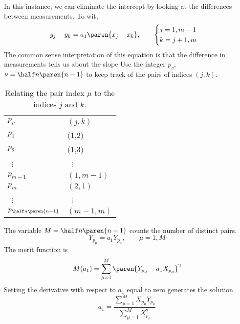 In this instance, we can eliminate the intercept by looking at the differences between measurements. To wit,
  \begin{equation*}   %
      y_{j} - y_{k} = a_{1} \paren{x_{j} - x_{k}}, \qquad \begin{cases}j=1, m-1\\ k= j+1, m\end{cases}
   \label{eq:difference jk}
  \end{equation*}
The common sense interpretation of this equation is that the difference in measurements tells us about the slope
Use the integer $p_{\nu}$, $\nu=\half n\paren{n-1}$ to keep track of the pairs of indices $(j,k)$. 
\begin{table}[htbp]
    \caption{Relating the pair index $\mu$ to the indices $j$ and $k$.}
    \begin{center}
        \begin{tabular}{ll}
					$p_{\mu}$ & $(j,k)$ \\\hline
    			$p_{1}$ & (1,2) \\
    			$p_{2}$ & (1,3) \\
    			\ $\vdots$ & \ $\vdots$ \\
    			$p_{m-1}$ & $(1,m-1)$  \\
    			$p_{m}$ & $(2,1)$  \\
    			\ $\vdots$ & \ $\vdots$ \\
    			$p_{\half n\paren{n-1}}$ & $(m-1,m)$  \\
        \end{tabular}
    \end{center}
    \label{default}
\end{table}
The variable $M  = \half n\paren{n-1}$ counts the number of distinct pairs.
  \begin{equation*}   %
      Y_{p_{\mu}} = a_{1} Y_{p_{\mu}}, \qquad \mu = 1, M
   \label{eq:difference jk}
  \end{equation*}
The merit function is
  \begin{equation*}   %
      M(a_{1}) = \sum_{\mu=1}^{M} \paren{Y_{p_{\mu}} - a_{1} X_{p_{\mu}}}^{2}
  \end{equation*}
Setting the derivative with respect to $a_{1}$ equal to zero generates the solution
  \begin{equation*}   %
      a_{1} = \frac{\sum_{\mu=1}^{M} X_{p_{\mu}} Y_{p_{\mu}}} {\sum_{\mu=1}^{M} X_{p_{\mu}}^{2}}
  \end{equation*}

